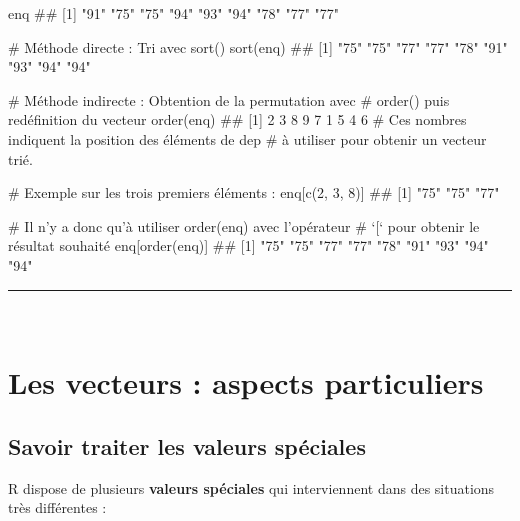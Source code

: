 \documentclass[12pt,twosided, notitlepage]{book}
\newenvironment{Shaded}{}{}
\newcommand{\KeywordTok}[1]{\textcolor[rgb]{0.00,0.00,1.00}{#1}}
\newcommand{\DecValTok}[1]{#1}
\newcommand{\CommentTok}[1]{\textcolor[rgb]{0.00,0.50,0.00}{#1}}
\newcommand{\NormalTok}[1]{#1}
\renewenvironment{Shaded}{\begin{snugshade}}{\end{snugshade}}
\begin{document}
\begin{Shaded}
\begin{Highlighting}[]
\NormalTok{enq}
\NormalTok{  ## [1] "91" "75" "75" "94" "93" "94" "78" "77" "77"}

\CommentTok{# Méthode directe : Tri avec sort()}
\KeywordTok{sort}\NormalTok{(enq)}
\NormalTok{  ## [1] "75" "75" "77" "77" "78" "91" "93" "94" "94"}

\CommentTok{# Méthode indirecte : Obtention de la permutation avec }
\CommentTok{# order() puis redéfinition du vecteur}
\KeywordTok{order}\NormalTok{(enq)}
\NormalTok{  ## [1] 2 3 8 9 7 1 5 4 6}
\CommentTok{# Ces nombres indiquent la position des éléments de dep}
\CommentTok{# à utiliser pour obtenir un vecteur trié. }

\CommentTok{# Exemple sur les trois premiers éléments :}
\NormalTok{enq[}\KeywordTok{c}\NormalTok{(}\DecValTok{2}\NormalTok{, }\DecValTok{3}\NormalTok{, }\DecValTok{8}\NormalTok{)]}
\NormalTok{  ## [1] "75" "75" "77"}

\CommentTok{# Il n'y a donc qu'à utiliser order(enq) avec l'opérateur}
\CommentTok{# `[` pour obtenir le résultat souhaité}
\NormalTok{enq[}\KeywordTok{order}\NormalTok{(enq)]}
\NormalTok{  ## [1] "75" "75" "77" "77" "78" "91" "93" "94" "94"}
\end{Highlighting}
\end{Shaded}

\begin{center} \rule{0.5\linewidth}{\linethickness}\end{center}

\bigskip  \fi 

~

\section{Les vecteurs : aspects
particuliers}\label{les-vecteurs-aspects-particuliers}

\subsection{Savoir traiter les valeurs
spéciales}\label{savoir-traiter-les-valeurs-speciales}

R dispose de plusieurs \textbf{valeurs spéciales} qui interviennent dans
des situations très différentes :
\end{document}
